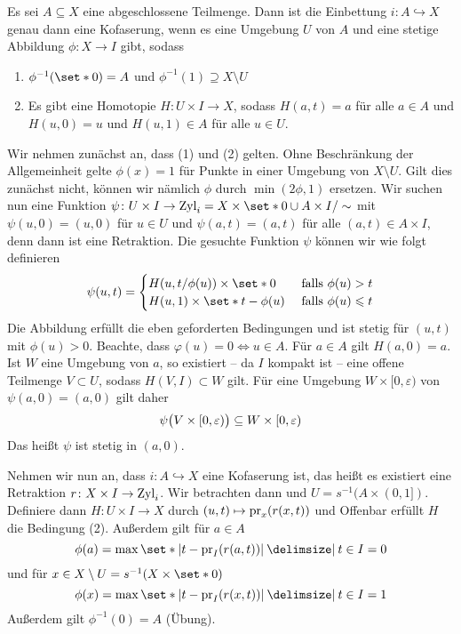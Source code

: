 \begin{satz}[{name={Charakterisierung von Kofaserungen}}]
	Es sei $A \subseteq X$  eine abgeschlossene Teilmenge.
	Dann ist die Einbettung $i \colon A \hookrightarrow X$ genau dann eine Kofaserung, wenn es eine Umgebung $U$ von $A$ und eine stetige Abbildung $\phi \colon X \to I$ gibt, sodass 
	\begin{enumerate}[(1)]
		\item $\phi^{-1}(\set*{0}) = A$ und $\phi^{-1}(1) \supseteq X \setminus U$
		\item Es gibt eine Homotopie $H \colon U \times I \to X$, sodass $H(a,t)=a$ für alle $a \in A$ und $H(u,0)=u$ und $H(u,1) \in A$ für alle $u \in U$.
	\end{enumerate}
\end{satz}
\begin{beweis}
	Wir nehmen zunächst an, dass (1) und (2) gelten.
	Ohne Beschränkung der Allgemeinheit gelte $\phi(x)=1$ für Punkte in einer Umgebung von $X \setminus U$.
	Gilt dies zunächst nicht, können wir nämlich $\phi$ durch $\min(2 \phi,1)$ ersetzen.
	Wir suchen nun eine Funktion $\psi \colon U \times I \to \Zyl_i = X \times \set*{0} \cup A \times I/\sim$ mit $\psi(u,0)=(u,0)$ für $u \in U$ und $\psi(a,t)=(a,t)$ für alle $(a,t) \in A \times I$, denn dann ist
	eine Retraktion.
	Die gesuchte Funktion $\psi$ können wir wie folgt definieren
	\[
		\psi(u,t) = \begin{cases}
			H(u,t/\phi(u)) \times \set*{0} &\text{ falls }\phi(u)>t\\
			H(u,1) \times \set*{t- \phi(u)} &\text{ falls } \phi(u)\le t
		\end{cases}
	\]
	Die Abbildung erfüllt die eben geforderten Bedingungen und ist stetig für $(u,t)$ mit $\phi(u)>0$.
	Beachte, dass $\varphi(u)=0 \iff u \in A$.
	Für $a \in A$ gilt $H(a,0)=a$.
	Ist $W$ eine Umgebung von $a$, so existiert -- da $I$ kompakt ist -- eine offene Teilmenge $V \subset U$, sodass $H(V,I) \subset W$ gilt.
	Für eine Umgebung $W \times [0,\varepsilon)$ von $\psi(a,0)=(a,0)$ gilt daher
	\[
		\psi \enbrace[\big]{V\times [0,\varepsilon)} \subseteq W \times [0,\varepsilon)
	\]
	Das heißt $\psi$ ist stetig in $(a,0)$.
	
	Nehmen wir nun an, dass $i \colon A \hookrightarrow X$ eine Kofaserung ist, das heißt es existiert eine Retraktion $r \colon  X\times I \to \Zyl_i$.
	Wir betrachten dann
	und $U = s^{-1}(A \times (0,1])$.
	Definiere dann $H \colon U \times I \to X$ durch $(u,t) \mapsto \pr_x(r(x,t))$ und
	Offenbar erfüllt $H$ die Bedingung (2).
	Außerdem gilt für $a \in A$
	\[
		\phi(a) = \max \set*{\abs*{t - \pr_I(r(a,t))} \given t \in I} =0
	\]
	und für $x \in X\setminus U = s^{-1}(X \times \set*{0})$
	\[
		\phi(x) = \max \set*{\abs*{t- \pr_I \enbrace*{r(x,t)}} \given t \in I} = 1
	\]
	Außerdem gilt $\phi^{-1}(0)=A$ (Übung).
\end{beweis}

